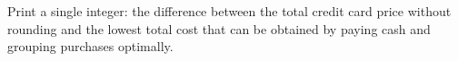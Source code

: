
Print a single integer: the difference between the total credit card price without
rounding and the lowest total cost that can be obtained by paying cash
and grouping purchases optimally.

